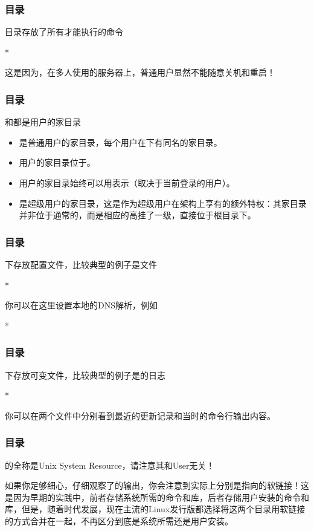 \begin{frame}
    \frametitle{目录}
    目录存放了所有才能执行的命令
    \begin{Code}*
        
    \end{Code}
    这是因为，在多人使用的服务器上，普通用户显然不能随意关机和重启！ 
\end{frame}

\begin{frame}
    \frametitle{目录}
    和都是用户的家目录
    \begin{itemize}
        \item {}是普通用户的家目录，每个用户在下有同名的家目录。
        \item 用户的家目录位于。
        \item 用户的家目录始终可以用\code{\~}表示（取决于当前登录的用户）。
        \item {}是超级用户的家目录，这是作为超级用户在架构上享有的额外特权：其家目录并非位于通常的，而是相应的高挂了一级，直接位于根目录下。
    \end{itemize}
\end{frame}

\begin{frame}
    \frametitle{目录}
    下存放配置文件，比较典型的例子是文件
    \begin{Code}*
        
    \end{Code}
    你可以在这里设置本地的DNS解析，例如
    \begin{Code}*
        
    \end{Code}
\end{frame}

\begin{frame}
    \frametitle{目录}
    下存放可变文件，比较典型的例子是的日志
    \begin{Code}*
        
    \end{Code}
    你可以在两个文件中分别看到最近的更新记录和当时的命令行输出内容。
\end{frame}

\begin{frame}
    \frametitle{目录}
    的全称是Unix System Resource，请注意其和User无关！

    如果你足够细心，仔细观察了的输出，你会注意到实际上分别是指向的软链接！这是因为早期的实践中，前者存储系统所需的命令和库，后者存储用户安装的命令和库，但是，随着时代发展，现在主流的Linux发行版都选择将这两个目录用软链接的方式合并在一起，不再区分到底是系统所需还是用户安装。
\end{frame}

